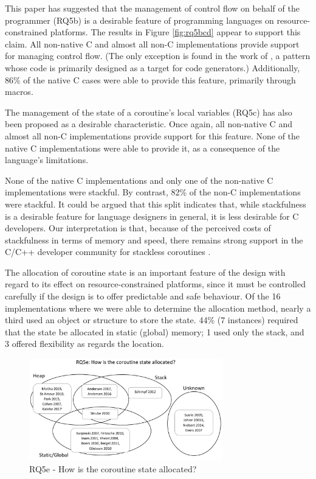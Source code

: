 \documentclass[format=acmsmall, review=false, screen=false]{acmart}
\begin{document}
This paper has suggested that the management of control flow on behalf of the programmer (RQ5b) is a desirable feature of programming languages on resource-constrained platforms. The results in Figure \ref{fig:rq5bcd} appear to support this claim. All non-native C and almost all non-C implementations provide support for managing control flow. (The only exception is found in the work of , a pattern whose code is primarily designed as a target for code generators.) Additionally, 86\% of the native C cases were able to provide this feature, primarily through macros.

The management of the state of a coroutine’s local variables (RQ5c) has also been proposed as a desirable characteristic.  Once again, all non-native C and almost all non-C implementations provide support for this feature. None of the native C implementations were able to provide it, as a consequence of the language’s limitations.

None of the native C implementations and only one of the non-native C implementations were stackful. By contrast, 82\% of the non-C implementations were stackful. It could be argued that this split indicates that, while stackfulness is a desirable feature for language designers in general, it is less desirable for C developers. Our interpretation is that, because of the perceived costs of stackfulness in terms of memory and speed, there remains strong support in the C/C++ developer community for stackless coroutines \cite{Dunkels2006}.

The allocation of coroutine state is an important feature of the design with regard to its effect on resource-constrained platforms, since it must be controlled carefully if the design is to offer predictable and safe behaviour. Of the 16 implementations where we were able to determine the allocation method, nearly a third used an object or structure to store the state. 44\% (7 instances) required that the state be allocated in static (global) memory; 1 used only the stack, and 3 offered flexibility as regards the location.

\begin{figure}
	\includegraphics[width=0.75\textwidth]{coroutine-state-venn-diagram}
	\caption{RQ5e - How is the coroutine state allocated?}
	\label{fig:rq5e2}
\end{figure}
\end{document}
